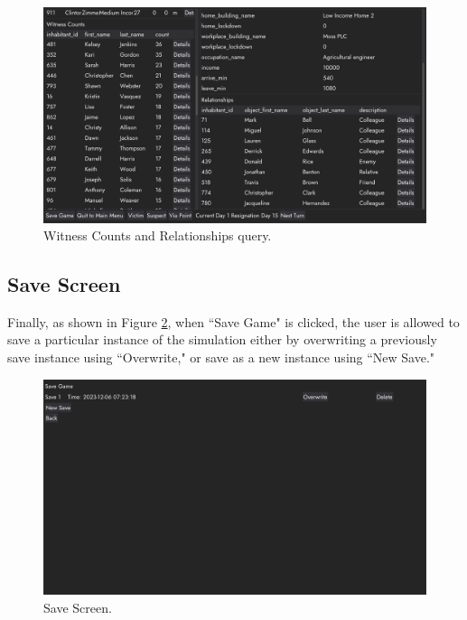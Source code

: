 \documentclass{article}
\begin{document}
\begin{figure}[H]
  \centering
  \includegraphics[width=1\textwidth]{witness_counts_relationships.png}
  \caption{Witness Counts and Relationships query.}
  \label{fig:witness_counts_relationships}
\end{figure}

\subsection{Save Screen}
Finally, as shown in Figure \ref{fig:save_game}, when ``Save Game" is clicked, the user is allowed to save a particular instance of the simulation either by overwriting a previously save instance using ``Overwrite," or save as a new instance using ``New Save."

\begin{figure}[H]
  \centering
  \includegraphics[width=1\textwidth]{save_game.png}
  \caption{Save Screen.}
  \label{fig:save_game}
\end{figure}
\end{document}

